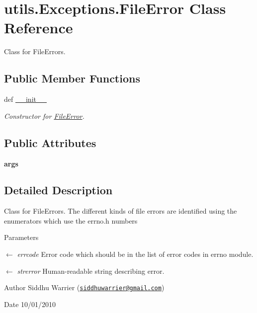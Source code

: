 \hypertarget{classutils_1_1Exceptions_1_1FileError}{
\section{utils.Exceptions.FileError Class Reference}
\label{classutils_1_1Exceptions_1_1FileError}
}


Class for FileErrors.  
\subsection*{Public Member Functions}
\begin{DoxyCompactItemize}
\item 
def \hyperlink{classutils_1_1Exceptions_1_1FileError_a8890e1c4392ed23344ccaa85f8d92340}{\_\-\_\-init\_\-\_\-}
\begin{DoxyCompactList}\small\item\em Constructor for \hyperlink{classutils_1_1Exceptions_1_1FileError}{FileError}. \item\end{DoxyCompactList}\end{DoxyCompactItemize}
\subsection*{Public Attributes}
\begin{DoxyCompactItemize}
\item 
\hypertarget{classutils_1_1Exceptions_1_1FileError_a25b65d9981c3e886f31d9a1f76be9214}{
{\bfseries args}}
\label{classutils_1_1Exceptions_1_1FileError_a25b65d9981c3e886f31d9a1f76be9214}

\end{DoxyCompactItemize}


\subsection{Detailed Description}
Class for FileErrors. The different kinds of file errors are identified using the enumerators which use the errno.h numbers 
\begin{DoxyParams}{Parameters}
\item[\mbox{$\leftarrow$} {\em errcode}]Error code which should be in the list of error codes in errno module. \item[\mbox{$\leftarrow$} {\em strerror}]Human-\/readable string describing error. \end{DoxyParams}
\begin{DoxyAuthor}{Author}
Siddhu Warrier (\href{mailto:siddhuwarrier@gmail.com}{\tt siddhuwarrier@gmail.com}) 
\end{DoxyAuthor}
\begin{DoxyDate}{Date}
10/01/2010 
\end{DoxyDate}


